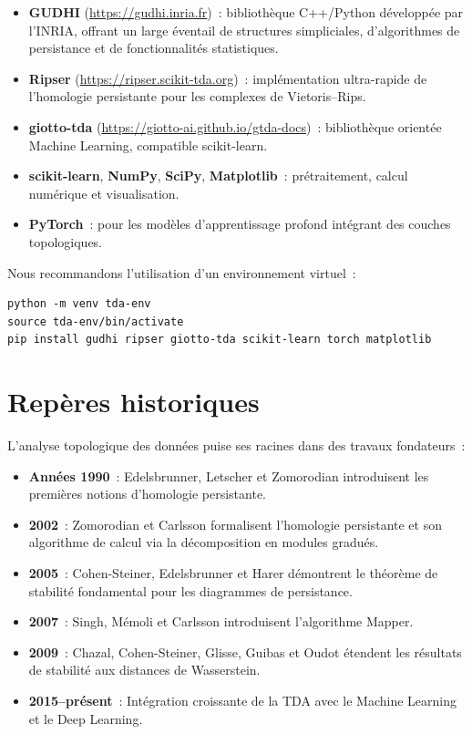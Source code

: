 \begin{itemize}
  \item \textbf{GUDHI} (\url{https://gudhi.inria.fr})~: biblioth\`eque
        C++/Python d\'evelopp\'ee par l'INRIA, offrant un large \'eventail de
        structures simpliciales, d'algorithmes de persistance et de
        fonctionnalit\'es statistiques.
  \item \textbf{Ripser} (\url{https://ripser.scikit-tda.org})~:
        impl\'ementation ultra-rapide de l'homologie persistante pour les
        complexes de Vietoris--Rips.
  \item \textbf{giotto-tda} (\url{https://giotto-ai.github.io/gtda-docs})~:
        biblioth\`eque orient\'ee Machine Learning, compatible scikit-learn.
  \item \textbf{scikit-learn}, \textbf{NumPy}, \textbf{SciPy},
        \textbf{Matplotlib}~: pr\'etraitement, calcul num\'erique et
        visualisation.
  \item \textbf{PyTorch}~: pour les mod\`eles d'apprentissage profond
        int\'egrant des couches topologiques.
\end{itemize}

\begin{attention}[title=\textbf{Installation recommand\'ee}]
Nous recommandons l'utilisation d'un environnement virtuel~:
\begin{verbatim}
python -m venv tda-env
source tda-env/bin/activate
pip install gudhi ripser giotto-tda scikit-learn torch matplotlib
\end{verbatim}
\end{attention}

\section*{Rep\`eres historiques}

L'analyse topologique des donn\'ees puise ses racines dans des travaux
fondateurs~:

\begin{itemize}
  \item \textbf{Ann\'ees 1990}~: Edelsbrunner, Letscher et Zomorodian
        introduisent les premi\`eres notions d'homologie persistante.
  \item \textbf{2002}~: Zomorodian et Carlsson formalisent l'homologie
        persistante et son algorithme de calcul via la d\'ecomposition en
        modules gradu\'es.
  \item \textbf{2005}~: Cohen-Steiner, Edelsbrunner et Harer d\'emontrent
        le th\'eor\`eme de stabilit\'e fondamental pour les diagrammes de
        persistance.
  \item \textbf{2007}~: Singh, M\'emoli et Carlsson introduisent
        l'algorithme Mapper.
  \item \textbf{2009}~: Chazal, Cohen-Steiner, Glisse, Guibas et Oudot
        \'etendent les r\'esultats de stabilit\'e aux distances de
        Wasserstein.
  \item \textbf{2015--pr\'esent}~: Int\'egration croissante de la TDA
        avec le Machine Learning et le Deep Learning.
\end{itemize}

